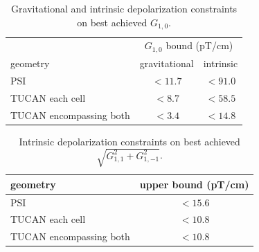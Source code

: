 \documentclass[preprint,12pt]{elsarticle}
\begin{document}
\begin{table}[tbp]
\centering
\small
\setlength{\tabcolsep}{4pt}
\renewcommand{\arraystretch}{1.1}
\caption{Gravitational and intrinsic depolarization constraints on best achieved $G_{1,0}$.}
\label{tab:g10}
\begin{tabular}{lcc}
\hline
 & \multicolumn{2}{c}{$G_{1,0}$ bound (pT/cm)} \\
geometry & gravitational & intrinsic \\
\hline
PSI & $< 11.7$ & $< 91.0$ \\
TUCAN each cell & $< 8.7$ & $< 58.5$ \\
TUCAN encompassing both & $< 3.4$ & $< 14.8$ \\
\hline
\end{tabular}
\end{table}

\begin{table}[tbp]
\centering
\small
\setlength{\tabcolsep}{4pt}
\renewcommand{\arraystretch}{1.1}
\caption{Intrinsic depolarization constraints on best achieved $\sqrt{G_{1,1}^2+G_{1,-1}^2}$.}
\label{tab:g11}
\begin{tabular}{lc}
\hline
geometry & upper bound (pT/cm) \\
\hline
PSI & $< 15.6$ \\
TUCAN each cell & $< 10.8$ \\
TUCAN encompassing both & $< 10.8$ \\
\hline
\end{tabular}
\end{table}
\end{document}
